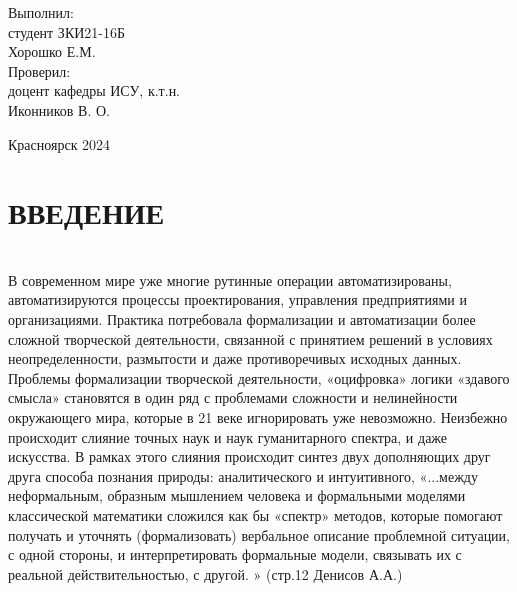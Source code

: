 \documentclass[a4paper,12pt]{report}
\renewcommand{\contentsname}{Содержание}
\begin{document}
\begin{flushright}
Выполнил:\\
студент ЗКИ21-16Б \\
Хорошко Е.М.\\
\vspace{1.5em}
Проверил:\\
доцент кафедры ИСУ, к.т.н.\\
Иконников В. О.\\
\end{flushright} 
\begin{center}
	\vspace{8em}
	Красноярск 2024
\end{center}
\newpage

	\def\contentsname{Содержание}
\tableofcontents
\newpage

\chapter*{ВВЕДЕНИЕ}
 \\

В современном мире уже многие рутинные операции автоматизированы, автоматизируются процессы проектирования, управления предприятиями и организациями. Практика потребовала формализации и автоматизации более сложной творческой деятельности, связанной с принятием решений в условиях неопределенности, размытости и даже противоречивых исходных данных.  Проблемы формализации творческой деятельности, «оцифровка» логики «здавого смысла» становятся в один ряд с проблемами сложности и нелинейности окружающего мира, которые в 21 веке игнорировать уже невозможно. Неизбежно происходит слияние точных наук и наук гуманитарного спектра, и даже искусства. В рамках этого слияния происходит синтез двух дополняющих друг друга способа познания природы: аналитического и интуитивного, «...между неформальным, образным мышлением человека и формальными моделями классической математики сложился как бы «спектр» методов, которые помогают получать и уточнять (формализовать) вербальное описание проблемной ситуации, с одной стороны, и интерпретировать формальные модели, связывать их с реальной действительностью, с другой. » (стр.12 Денисов А.А.) \\
\end{document}
